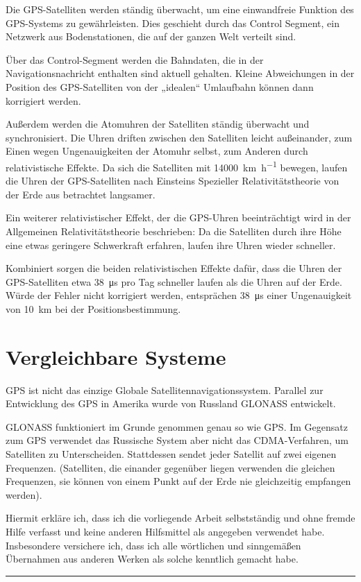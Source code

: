\documentclass[12pt,a4paper]{scrartcl}
\begin{document}
Die GPS-Satelliten werden ständig überwacht, um eine einwandfreie Funktion des GPS-Systems zu gewährleisten. Dies geschieht durch das Control Segment, ein Netzwerk aus Bodenstationen, die auf der ganzen Welt verteilt sind.

Über das Control-Segment werden die Bahndaten, die in der Navigationsnachricht enthalten sind aktuell gehalten. Kleine Abweichungen in der Position des GPS-Satelliten von der „idealen“ Umlaufbahn können dann korrigiert werden.

Außerdem werden die Atomuhren der Satelliten ständig überwacht und synchronisiert. Die Uhren driften zwischen den Satelliten leicht außeinander, zum Einen wegen Ungenauigkeiten der Atomuhr selbst, zum Anderen durch relativistische Effekte.
Da sich die Satelliten mit \SI{14000}{\kilo\meter\per\hour} bewegen, laufen die Uhren der GPS-Satelliten nach Einsteins Spezieller Relativitätstheorie von der Erde aus betrachtet langsamer. 

Ein weiterer relativistischer Effekt, der die GPS-Uhren beeinträchtigt wird in der Allgemeinen Relativitätstheorie beschrieben: Da die Satelliten durch ihre Höhe eine etwas geringere Schwerkraft erfahren, laufen ihre Uhren wieder schneller.

Kombiniert sorgen die beiden relativistischen Effekte dafür, dass die Uhren der GPS-Satelliten etwa \SI{38}{\micro\second} pro Tag schneller laufen als die Uhren auf der Erde. Würde der Fehler nicht korrigiert werden, entsprächen \SI{38}{\micro\second} einer Ungenauigkeit von \SI{10}{\kilo\meter} bei der Positionsbestimmung. \cite{ohio_gpsrelativity}

\section{Vergleichbare Systeme}
GPS ist nicht das einzige Globale Satellitennavigationssystem. Parallel zur Entwicklung des GPS in Amerika wurde von Russland GLONASS entwickelt.

GLONASS funktioniert im Grunde genommen genau so wie GPS. Im Gegensatz zum GPS verwendet das Russische System aber nicht das CDMA-Verfahren, um Satelliten zu Unterscheiden. Stattdessen sendet jeder Satellit auf zwei eigenen Frequenzen. (Satelliten, die einander gegenüber liegen verwenden die gleichen Frequenzen, sie können von einem Punkt auf der Erde nie gleichzeitig empfangen werden).



\newpage
\printbibliography

\vspace{2cm}
Hiermit erkläre ich, dass ich die vorliegende Arbeit selbstständig und ohne fremde Hilfe verfasst und keine anderen Hilfsmittel als angegeben verwendet habe. Insbesondere versichere ich, dass ich alle wörtlichen und sinngemäßen Übernahmen aus anderen Werken als solche kenntlich gemacht habe.
\vspace{2cm}
\hrule
\end{document}
